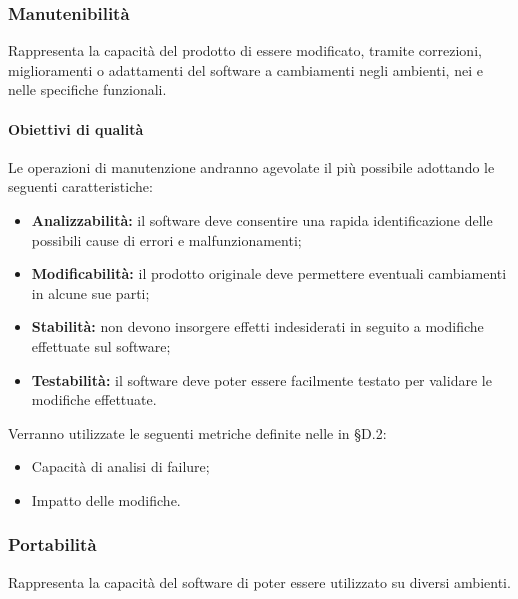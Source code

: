 \documentclass[PianoDiQualifica.tex]{subfiles}
\begin{document}
\subsubsection{Manutenibilità}
Rappresenta la capacità del prodotto di essere modificato, tramite correzioni, miglioramenti o adattamenti del software a cambiamenti negli ambienti, nei  e nelle specifiche funzionali.
\paragraph{Obiettivi di qualità}
Le operazioni di manutenzione andranno agevolate il più possibile adottando le seguenti caratteristiche:
\begin{itemize}
	\item \textbf{Analizzabilità:} il software deve consentire una rapida identificazione delle possibili cause di errori e malfunzionamenti;
	\item \textbf{Modificabilità:} il prodotto originale deve permettere eventuali cambiamenti in alcune sue parti;
	\item \textbf{Stabilità:} non devono insorgere effetti indesiderati in seguito a modifiche effettuate sul software;
	\item \textbf{Testabilità:} il software deve poter essere facilmente testato per validare le modifiche effettuate.
\end{itemize}
Verranno utilizzate le seguenti metriche definite nelle \ndp in \S{D.2}:
\begin{itemize}
	\item {} Capacità di analisi di failure;
	\item {} Impatto delle modifiche.
\end{itemize}

\subsubsection{Portabilità}
Rappresenta la capacità del software di poter essere utilizzato su diversi ambienti.
\end{document}
